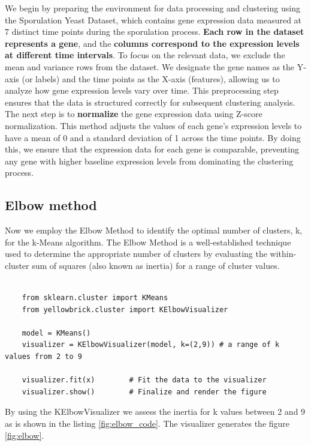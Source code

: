 \documentclass{article}
\begin{document}
We begin by preparing the environment for data processing and clustering using the Sporulation Yeast Dataset, which contains gene expression data measured at 7 distinct time points during the sporulation process. \textbf{Each row in the dataset represents a gene}, and the \textbf{columns correspond to the expression levels at different time intervals}. To focus on the relevant data, we exclude the mean and variance rows from the dataset. We designate the gene names as the Y-axis (or labels) and the time points as the X-axis (features), allowing us to analyze how gene expression levels vary over time. This preprocessing step ensures that the data is structured correctly for subsequent clustering analysis.
\\

The next step is to \textbf{normalize} the gene expression data using Z-score normalization. This method adjusts the values of each gene's expression levels to have a mean of 0 and a standard deviation of 1 across the time points. By doing this, we ensure that the expression data for each gene is comparable, preventing any gene with higher baseline expression levels from dominating the clustering process. 
\\
\subsection{Elbow method}
Now we employ the Elbow Method to identify the optimal number of clusters, 
k, for the k-Means algorithm. The Elbow Method is a well-established technique used to determine the appropriate number of clusters by evaluating the within-cluster sum of squares (also known as inertia) for a range of cluster values. 
\\

\begin{lstlisting}[style=mypython, label=fig:elbow_code,caption=Implementation of Elbow Method to the dataset]
	 
	from sklearn.cluster import KMeans
	from yellowbrick.cluster import KElbowVisualizer
	
	model = KMeans()
	visualizer = KElbowVisualizer(model, k=(2,9)) # a range of k values from 2 to 9
	
	visualizer.fit(x)        # Fit the data to the visualizer
	visualizer.show()        # Finalize and render the figure	
\end{lstlisting}


By using the KElbowVisualizer  we assess the inertia for k values between 2 and 9 as is shown in the listing \ref{fig:elbow_code}.
The visualizer generates the figure \ref{fig:elbow}.
\end{document}
